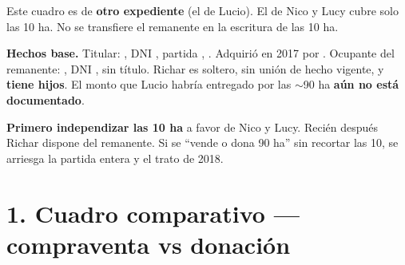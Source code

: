 \documentclass[12pt,a4paper]{article}
\begin{document}


\noindent Este cuadro es de \textbf{otro expediente} (el de Lucio). El de Nico y Lucy cubre solo las 10 ha. No se transfiere el remanente en la escritura de las 10 ha.

\vspace{0.2em}
\noindent \textbf{Hechos base.} Titular: \VendedorNombreCompleto, DNI \VendedorDNI, partida \PartidaMatriz, \AreaMatriz. Adquirió en 2017 por \PrecioAdquisicionMatriz. Ocupante del remanente: \IntermediarioNombre, DNI \IntermediarioDNI, sin título. Richar es soltero, sin unión de hecho vigente, y \textbf{tiene hijos}. El monto que Lucio habría entregado por las $\sim$90 ha \textbf{aún no está documentado}.

\textbf{Primero independizar las 10 ha} a favor de Nico y Lucy. Recién después Richar dispone del remanente. Si se ``vende o dona 90 ha'' sin recortar las 10, se arriesga la partida entera y el trato de 2018.

\section*{1. Cuadro comparativo --- compraventa vs donación}
\end{document}
